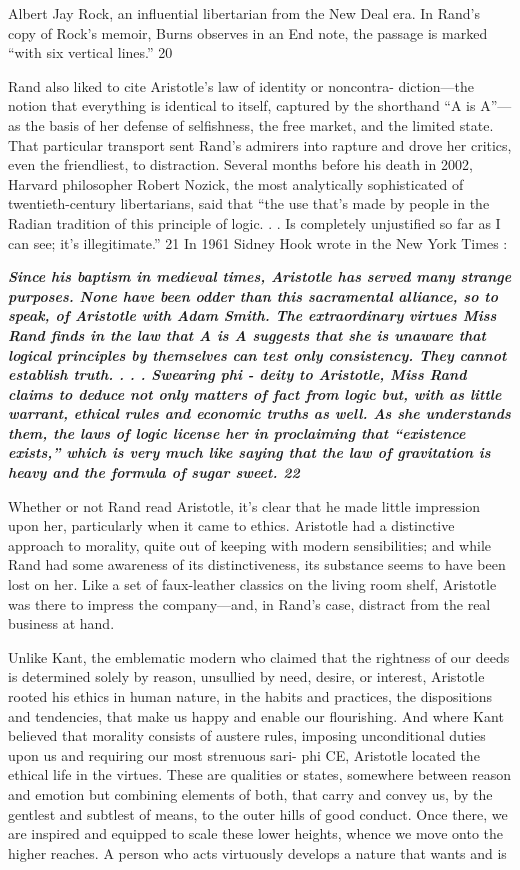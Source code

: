 Albert Jay Rock, an influential libertarian from the New Deal era. In Rand’s copy of Rock’s memoir, Burns observes in an End note, the passage is marked “with six vertical lines.” {\color{blue} 20 } {\par} Rand also liked to cite Aristotle’s law of identity or noncontra- diction—the notion that everything is identical to itself, captured by the shorthand “A is A”—as the basis of her defense of selfishness, the free market, and the limited state. That particular transport sent Rand’s admirers into rapture and drove her critics, even the friendliest, to distraction. Several months before his death in 2002, Harvard philosopher Robert Nozick, the most analytically sophisticated of twentieth-century libertarians, said that “the use that’s made by people in the Radian tradition of this principle of logic. . . Is completely unjustified so far as I can see; it’s illegitimate.” {\color{blue} 21 } In 1961 Sidney Hook wrote in the New York Times :{\par} {\textbf{\textit{Since his baptism in medieval times, Aristotle has served many strange purposes. None have been odder than this sacramental alliance, so to speak, of Aristotle with Adam Smith. The extraordinary virtues Miss Rand finds in the law that A is A suggests that she is unaware that logical principles by themselves can test only consistency. They cannot establish truth. . . . Swearing phi - deity to Aristotle, Miss Rand claims to deduce not only matters of fact from logic but, with as little warrant, ethical rules and economic truths as well. As she understands them, the laws of logic license her in proclaiming that “existence exists,” which is very much like saying that the law of gravitation is heavy and the formula of sugar sweet. {\color{blue} 22 } } } }{\par} Whether or not Rand read Aristotle, it’s clear that he made little impression upon her, particularly when it came to ethics. Aristotle had a distinctive approach to morality, quite out of keeping with modern sensibilities; and while Rand had some awareness of its distinctiveness, its substance seems to have been lost on her. Like a set of faux-leather classics on the living room shelf, Aristotle was there to impress the company—and, in Rand’s case, distract from the real business at hand.{\par} Unlike Kant, the emblematic modern who claimed that the rightness of our deeds is determined solely by reason, unsullied by need, desire, or interest, Aristotle rooted his ethics in human nature, in the habits and practices, the dispositions and tendencies, that make us happy and enable our flourishing. And where Kant believed that morality consists of austere rules, imposing unconditional duties upon us and requiring our most strenuous sari- phi CE, Aristotle located the ethical life in the virtues. These are qualities or states, somewhere between reason and emotion but combining elements of both, that carry and convey us, by the gentlest and subtlest of means, to the outer hills of good conduct. Once there, we are inspired and equipped to scale these lower heights, whence we move onto the higher reaches. A person who acts virtuously develops a nature that wants and is 